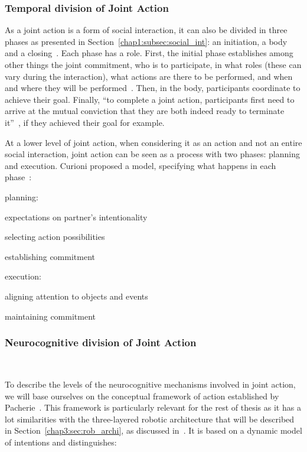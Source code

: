 \documentclass[a4paper,11pt,twoside]{StyleThese}
\begin{document}
\subsubsection{Temporal division of Joint Action}
As a joint action is a form of social interaction, it can also be divided in three phases as presented in Section~\ref{chap1:subsec:social_int}: an initiation, a body and a closing~\cite{heesen_2017_social}. Each phase has a role. First, the initial phase establishes among other things the joint commitment, \ie who is to participate, in what roles (these can vary during the interaction), what actions are there to be performed, and when and where they will be performed~\cite{clark_2006_social}. Then, in the body, participants coordinate to achieve their goal. Finally, ``to complete a joint action, participants first need to arrive at the mutual conviction that they are both indeed ready to terminate it''~\cite{heesen_2017_social}, if they achieved their goal for example.

At a lower level of joint action, when considering it as an action and not an entire social interaction, joint action can be seen as a process with two phases: planning and execution. Curioni \etal{} proposed a model, specifying what happens in each phase~\cite{curioni_2017_joint}: 
\begin{bulletList}
	\item planning: 
	\begin{bulletList}
		\item expectations on partner's intentionality
		\item selecting action possibilities
		\item establishing commitment
	\end{bulletList}
	\item execution:
	\begin{bulletList}
		\item aligning attention to objects and events
		\item maintaining commitment
	\end{bulletList}
\end{bulletList}
\subsubsection{Neurocognitive division of Joint Action}~\label{chap1:subsubsec:neuro_seg}

To describe the levels of the neurocognitive mechanisms involved in joint action, we will base ourselves on the conceptual framework of action established by Pacherie~\cite{pacherie_2008_phenomenology}. This framework is particularly relevant for the rest of thesis as it has a lot similarities with the three-layered robotic architecture that will be described in Section~\ref{chap3:sec:rob_archi}, as discussed in~\cite{clodic_2017_key}. It is based on a dynamic model of intentions and distinguishes:
\end{document}
